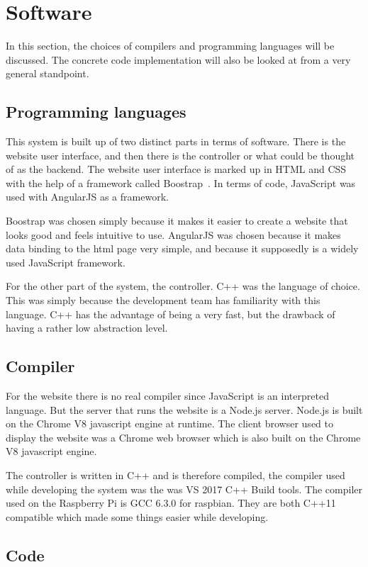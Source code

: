 \section{Software}
In this section, the choices of compilers and programming languages will be discussed. The concrete code implementation will also be looked at from a very general standpoint.

\subsection{Programming languages}
This system is built up of two distinct parts in terms of software. There is the website user interface, and then there is the controller or what could be thought of as the backend. The website user interface is marked up in HTML and CSS with the help of a framework called Boostrap~\cite{bootstrap}. In terms of code, JavaScript was used with AngularJS as a framework. 

Boostrap was chosen simply because it makes it easier to create a website that looks good and feels intuitive to use. AngularJS was chosen because it makes data binding to the html page very simple, and because it supposedly is a widely used JavaScript framework.

For the other part of the system, the controller. C++ was the language of choice. This was simply because the development team has familiarity with this language. C++ has the advantage of being a very fast, but the drawback of having a rather low abstraction level. 
 
\subsection{Compiler}
For the website there is no real compiler since JavaScript is an interpreted language. But the server that runs the website is a Node.js server. Node.js is built on the Chrome V8 javascript engine at runtime. The client browser used to display the website was a Chrome web browser which is also built on the Chrome V8 javascript engine. 

The controller is written in C++ and is therefore compiled, the compiler used while developing the system was the was VS 2017 C++ Build tools\cite{VC-2017}. The compiler used on the Raspberry Pi is GCC 6.3.0 for raspbian\cite{GCC}. They are both C++11 compatible which made some things easier while developing. 

\subsection{Code}

